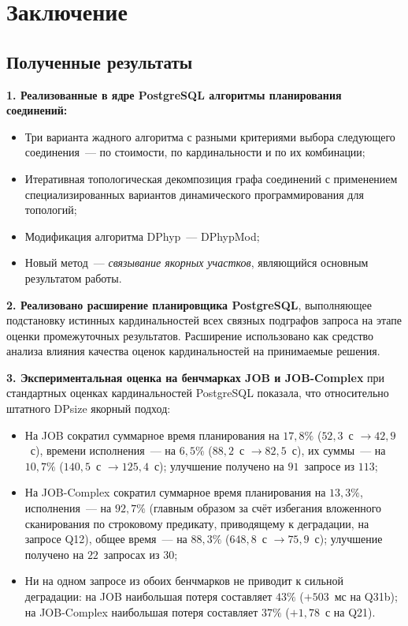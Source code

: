 \section{Заключение}

\subsection{Полученные результаты}

\textbf{1. Реализованные в ядре PostgreSQL алгоритмы планирования соединений:}
\begin{itemize}
    \item Три варианта жадного алгоритма с разными критериями выбора
    следующего соединения~--- по стоимости, по кардинальности и по их комбинации;
    \item Итеративная топологическая декомпозиция графа соединений с применением
    специализированных вариантов динамического программирования для топологий;
    \item Модификация алгоритма DPhyp~--- DPhypMod;
    \item Новый метод~--- \emph{связывание якорных участков}, являющийся основным
    результатом работы.
\end{itemize}

\textbf{2. Реализовано расширение планировщика PostgreSQL}, выполняющее
подстановку истинных кардинальностей всех связных подграфов запроса
на этапе оценки промежуточных результатов. Расширение использовано как средство
анализа влияния качества оценок кардинальностей на принимаемые решения.

\textbf{3. Экспериментальная оценка на бенчмарках JOB и JOB-Complex} при
стандартных оценках кардинальностей PostgreSQL показала, что относительно
штатного DPsize якорный подход:
\begin{itemize}
    \item На JOB сократил суммарное время планирования на $17{,}8\%$
    ($52{,}3$~с $\to 42{,}9$~с), времени исполнения~--- на $6{,}5\%$
    ($88{,}2$~с $\to 82{,}5$~с), их суммы~--- на $10{,}7\%$
    ($140{,}5$~с $\to 125{,}4$~с); улучшение получено на $91$~запросе из $113$;
    \item На JOB-Complex сократил суммарное время планирования на $13{,}3\%$,
    исполнения~--- на $92{,}7\%$ (главным образом за счёт избегания
    вложенного сканирования по строковому предикату, приводящему к деградации, на запросе Q12),
    общее время~--- на $88{,}3\%$ ($648{,}8$~с $\to 75{,}9$~с);
    улучшение получено на $22$~запросах из $30$;
    \item Ни на одном запросе из обоих бенчмарков не приводит к сильной
    деградации: на JOB наибольшая потеря составляет $43\%$ ($+503$~мс на Q31b);
    на JOB-Complex наибольшая потеря составляет $37\%$ ($+1{,}78$~с на Q21).
\end{itemize}

